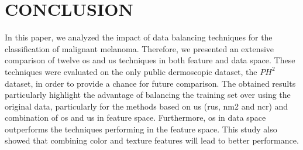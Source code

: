 \graphicspath{ {./content/Experiments-results/figures/} }

\section{\uppercase{Conclusion}}
\label{sec:cons} 

\noindent In this paper, we analyzed the impact of data balancing techniques for the classification of malignant melanoma. 
Therefore, we presented an extensive comparison of twelve \ac{os} and \ac{us} techniques in both feature and data space. 
These techniques were evaluated on the only public dermoscopic dataset, the $PH^{2}$ dataset, in order to provide a chance for future comparison.
The obtained results particularly highlight the advantage of balancing the training set over using the original data, particularly for the methods based on \ac{us} (\ac{rus}, \ac{nm2} and \ac{ncr}) and combination of \ac{os} and \ac{us} in feature space.
Furthermore, \ac{os} in data space outperforms the techniques performing in the feature space.
This study also showed that combining color and texture features will lead to better performance. 



